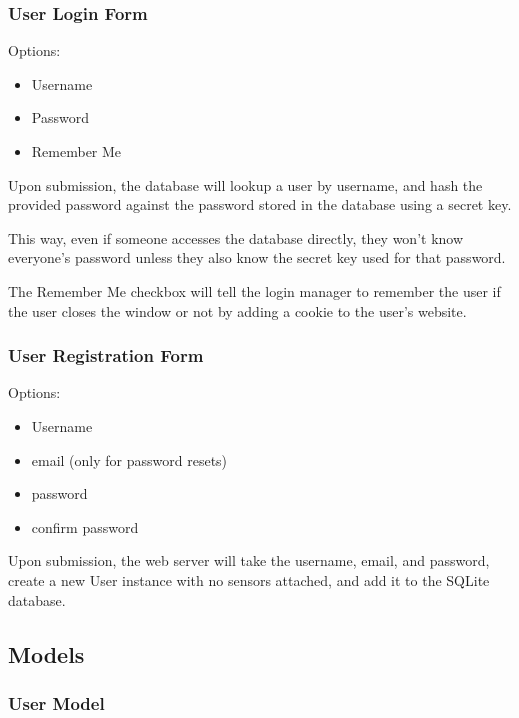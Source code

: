 \subsubsection{User Login Form}\label{user-login-form}

Options:

\begin{itemize}
\itemsep1pt\parskip0pt
\item
  Username
\item
  Password
\item
  Remember Me
\end{itemize}

Upon submission, the database will lookup a user by username, and hash
the provided password against the password stored in the database using
a secret key.

This way, even if someone accesses the database directly, they won't
know everyone's password unless they also know the secret key used for
that password.

The Remember Me checkbox will tell the login manager to remember the
user if the user closes the window or not by adding a cookie to the
user's website.

\subsubsection{User Registration Form}\label{user-registration-form}

Options:

\begin{itemize}
\itemsep1pt\parskip0pt
\item
  Username
\item
  email (only for password resets)
\item
  password
\item
  confirm password
\end{itemize}

Upon submission, the web server will take the username, email, and
password, create a new User instance with no sensors attached, and add
it to the SQLite database.

\subsection{Models}\label{models}

\subsubsection{User Model}\label{user-model}

